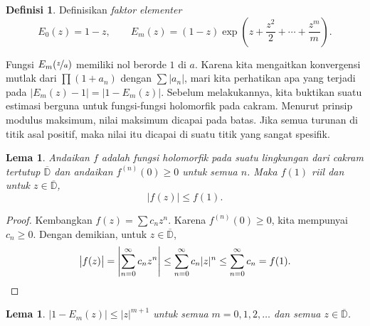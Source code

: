 \documentclass[12pt,openany]{book}
\newcommand{\sabs}[1]{\lvert {#1} \rvert}
\newcommand{\babs}[1]{\bigl\lvert {#1} \bigr\rvert}
\newcommand{\abs}[1]{\left\lvert {#1} \right\rvert}
\newcommand{\D}{{\mathbb{D}}}
\newcommand{\myindex}[1]{#1\index{#1}}
\theoremstyle{plain}
\newtheorem{lemma}[thm]{Lema}
\theoremstyle{remark}
\theoremstyle{definition}
\newtheorem{defn}[thm]{Definisi}
\theoremstyle{exercise}
\theoremstyle{example}
\begin{document}
\begin{defn}
Definisikan \emph{\myindex{faktor elementer}}
%
\begin{equation*}
E_0(z) = 1-z, \qquad
E_m(z) = (1-z) \exp\left( z +\frac{z^2}{2} + \cdots + \frac{z^m}{m} \right)
.
\end{equation*}
\end{defn}

Fungsi $E_m(\nicefrac{z}{a})$ memiliki nol berorde $1$ di $a$.
Karena kita mengaitkan konvergensi mutlak dari $\prod (1+a_n)$ dengan $\sum
\sabs{a_n}$, mari kita perhatikan apa yang terjadi pada $\babs{E_m(z)-1}=\babs{1-E_m(z)}$.
Sebelum melakukannya, kita buktikan suatu estimasi berguna untuk fungsi-fungsi holomorfik
pada cakram.
Menurut prinsip modulus maksimum, nilai maksimum dicapai pada batas.
Jika semua turunan di titik asal positif, maka nilai itu dicapai
di suatu titik yang sangat spesifik.

\begin{lemma} \label{lemma:maxprincpositive}
Andaikan $f$ adalah fungsi holomorfik pada suatu lingkungan dari cakram tertutup
$\overline{\D}$ dan andaikan $f^{(n)}(0) \geq 0$ untuk semua $n$.
Maka $f(1)$ riil dan untuk $z \in \overline{\D}$,
\begin{equation*}
\babs{f(z)} \leq f(1) .
\end{equation*}
\end{lemma}

\begin{proof}
Kembangkan $f(z) = \sum c_n z^n$.  Karena $f^{(n)}(0) \geq 0$,
kita mempunyai $c_n \geq 0$.
Dengan demikian, untuk $z \in \overline{\D}$,
\begin{equation*}
\babs{f(z)} =
\abs{\sum_{n=0}^\infty c_n z^n}
\leq
\sum_{n=0}^\infty c_n \sabs{z}^n
\leq
\sum_{n=0}^\infty c_n = f(1) .  \qedhere
\end{equation*}
\end{proof}

\begin{lemma} \label{lemma:elemfactbound}
\pagebreak[1]
$\sabs{1-E_m(z)} \leq \sabs{z}^{m+1}$ untuk semua $m = 0,1,2,\ldots$ dan semua 
$z \in \overline{\D}$.
\end{lemma}
\end{document}
